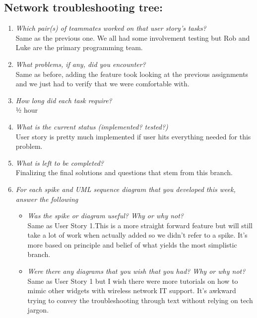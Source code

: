 \documentclass[12pt, letterpaper]{article}
\begin{document}
	   \subsection{Network troubleshooting tree:}
	   \begin{enumerate}
	   	\item \emph{Which pair(s) of teammates worked on that user story's tasks?}
	   	\\Same as the previous one. We all had some involvement testing but Rob and Luke are the primary programming team.
	   	\item \emph{What problems, if any, did you encounter?}
	   	\\ Same as before, adding the feature took looking at the previous assignments and we just had to verify that we were comfortable with.
	   	\item \emph{How long did each task require?}
	   	\\½ hour
	   	\item \emph{What is the current status (implemented? tested?)}
	   	\\User story is pretty much implemented if user hits everything needed for this problem.
	   	\item \emph{What is left to be completed?}
	   	\\Finalizing the final solutions and questions that stem from this branch.
	   	\item \emph{For each spike and UML sequence diagram that you developed this week, answer the following}
	   	\begin{itemize}
	   		\item \emph{Was the spike or diagram useful? Why or why not?}
	   		\\Same as User Story 1.This is a more straight forward feature but will still take a lot of work when actually added so we didn’t refer to a spike. It’s more based on principle and belief of what yields the most simplistic branch. 
	   		\item \emph{Were there any diagrams that you wish that you had? Why or why not?}
	   		\\Same as User Story 1 but I wish there were more tutorials on how to mimic other widgets with wireless network IT support. It’s awkward trying to convey the troubleshooting through text without relying on tech jargon.
	   	\end{itemize}
	   \end{enumerate}
   
\end{document}

